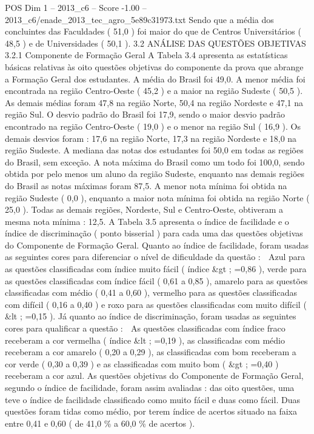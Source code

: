 \begin{textsample}{POS Dim 1 – 2013\_c6 – Score -1.00 – 2013\_c6/enade\_2013\_tec\_agro\_5e89c31973.txt}
Sendo que a média dos concluintes das Faculdades ( 51,0 ) foi maior do que de Centros Universitários ( 48,5 ) e de Universidades ( 50,1 ). 3.2 ANÁLISE DAS QUESTÕES OBJETIVAS 3.2.1 Componente de Formação Geral A Tabela 3.4 apresenta as estatísticas básicas relativas às oito questões objetivas do componente da prova que abrange a Formação Geral dos estudantes.
A média do Brasil foi 49,0.
A menor média foi encontrada na região Centro-Oeste ( 45,2 ) e a maior na região Sudeste ( 50,5 ).
As demais médias foram 47,8 na região Norte, 50,4 na região Nordeste e 47,1 na região Sul.
O desvio padrão do Brasil foi 17,9, sendo o maior desvio padrão encontrado na região Centro-Oeste ( 19,0 ) e o menor na região Sul ( 16,9 ).
Os demais desvios foram : 17,6 na região Norte, 17,3 na região Nordeste e 18,0 na região Sudeste.
A mediana das notas dos estudantes foi 50,0 em todas as regiões do Brasil, sem exceção.
A nota máxima do Brasil como um todo foi 100,0, sendo obtida por pelo menos um aluno da região Sudeste, enquanto nas demais regiões do Brasil as notas máximas foram 87,5.
A menor nota mínima foi obtida na região Sudeste ( 0,0 ), enquanto a maior nota mínima foi obtida na região Norte ( 25,0 ).
Todas as demais regiões, Nordeste, Sul e Centro-Oeste, obtiveram a mesma nota mínima : 12,5.
A Tabela 3.5 apresenta o índice de facilidade e o índice de discriminação ( ponto bisserial ) para cada uma das questões objetivas do Componente de Formação Geral.
Quanto ao índice de facilidade, foram usadas as seguintes cores para diferenciar o nível de dificuldade da questão :  Azul para as questões classificadas com índice muito fácil ( índice \&gt ; =0,86 ), verde para as questões classificadas com índice fácil ( 0,61 a 0,85 ), amarelo para as questões classificadas com médio ( 0,41 a 0,60 ), vermelho para as questões classificadas com difícil ( 0,16 a 0,40 ) e roxo para as questões classificadas com muito difícil ( \&lt ; =0,15 ).
Já quanto ao índice de discriminação, foram usadas as seguintes cores para qualificar a questão :  As questões classificadas com índice fraco receberam a cor vermelha ( índice \&lt ; =0,19 ), as classificadas com médio receberam a cor amarelo ( 0,20 a 0,29 ), as classificadas com bom receberam a cor verde ( 0,30 a 0,39 ) e as classificadas com muito bom ( \&gt ; =0,40 ) receberam a cor azul.
As questões objetivas do Componente de Formação Geral, segundo o índice de facilidade, foram assim avaliadas : das oito questões, uma teve o índice de facilidade classificado como muito fácil e duas como fácil.
Duas questões foram tidas como médio, por terem índice de acertos situado na faixa entre 0,41 e 0,60 ( de 41,0 \% a 60,0 \% de acertos ).

\end{textsample}
